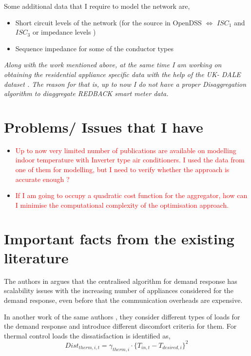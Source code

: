 \documentclass[12pt,a4paper]{article}
\begin{document}
Some additional data that I require to model the network are,
\begin{itemize}
    \item Short circuit levels of the network (for the source in OpenDSS $\Longleftrightarrow$ $ISC_1$ and $ISC_3$ or impedance levels )
    \item Sequence impedance for some of the conductor types
\end{itemize}

\emph{Along with the work mentioned above, at the same time I am working on obtaining the residential appliance specific data with the help of the UK- DALE dataset \cite{UK-DALE}. The reason for that is, up to now I do not have a proper Disaggregation algorithm to diaggregate REDBACK smart meter data.}


\section*{\large Problems/ Issues that I have}

\begin{itemize}
    \item \textcolor{red}{Up to now very limited number of publications are available on modelling indoor temperature with Inverter type air conditioners. I used the data from one of them for modelling, but I need to verify whether the approach is accurate enough ?} 
    
    \item \textcolor{red}{If I am going to occupy a quadratic cost function for the aggregator, how can I minimise the computational complexity of the optimisation approach.}
    
\end{itemize}

\section*{\large Important facts from the existing literature}

The authors in \cite{DBLP:journals/corr/MhannaCV16}
argues that the centralised algorithm for demand response has scalability issues with the increasing number of appliances considered for the demand response, even before that the communication overheads are expensive.

In another work of the same authors \cite{8106725}, they consider different types of loads for the demand response and introduce different discomfort criteria for them. 
For thermal control loads the dissatisfaction is identified as,
\begin{equation}
    Dist_{therm,i,t} = \gamma_{therm,i}\cdot \{T_{in,t} - T_{desired,i}\}^2
\end{equation}
\end{document}
